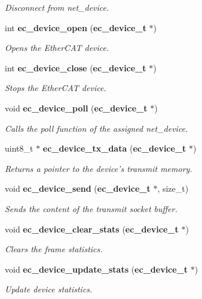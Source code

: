 \begin{DoxyCompactItemize}
\begin{DoxyCompactList}\small\item\em Disconnect from net\-\_\-device. \end{DoxyCompactList}\item 
int {\bf ec\-\_\-device\-\_\-open} ({\bf ec\-\_\-device\-\_\-t} $\ast$)
\begin{DoxyCompactList}\small\item\em Opens the Ether\-C\-A\-T device. \end{DoxyCompactList}\item 
int {\bf ec\-\_\-device\-\_\-close} ({\bf ec\-\_\-device\-\_\-t} $\ast$)
\begin{DoxyCompactList}\small\item\em Stops the Ether\-C\-A\-T device. \end{DoxyCompactList}\item 
void {\bf ec\-\_\-device\-\_\-poll} ({\bf ec\-\_\-device\-\_\-t} $\ast$)
\begin{DoxyCompactList}\small\item\em Calls the poll function of the assigned net\-\_\-device. \end{DoxyCompactList}\item 
uint8\-\_\-t $\ast$ {\bf ec\-\_\-device\-\_\-tx\-\_\-data} ({\bf ec\-\_\-device\-\_\-t} $\ast$)
\begin{DoxyCompactList}\small\item\em Returns a pointer to the device's transmit memory. \end{DoxyCompactList}\item 
void {\bf ec\-\_\-device\-\_\-send} ({\bf ec\-\_\-device\-\_\-t} $\ast$, size\-\_\-t)
\begin{DoxyCompactList}\small\item\em Sends the content of the transmit socket buffer. \end{DoxyCompactList}\item 
void {\bf ec\-\_\-device\-\_\-clear\-\_\-stats} ({\bf ec\-\_\-device\-\_\-t} $\ast$)\label{device_8h_a2889ce889e3a481040666349d4220829}

\begin{DoxyCompactList}\small\item\em Clears the frame statistics. \end{DoxyCompactList}\item 
void {\bf ec\-\_\-device\-\_\-update\-\_\-stats} ({\bf ec\-\_\-device\-\_\-t} $\ast$)\label{device_8h_a487e82c3004aafd09d2a2b993960ee60}

\begin{DoxyCompactList}\small\item\em Update device statistics. \end{DoxyCompactList}\end{DoxyCompactItemize}


